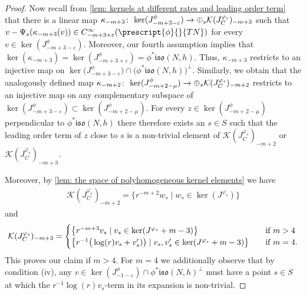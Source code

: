 \documentclass{article}
\numberwithin{equation}{section}        %
\theoremstyle{bfnote}
\theoremstyle{definition}
\theoremstyle{bfremark}
\newcommand{\col}{\colon \thinspace}        %
\begin{document}
\begin{proof}
    Now recall from \cref{lem: kernels at different rates and leading order term} that there is a linear map $\kappa_{-m+3} \col \ker (J_{-m+3-\varepsilon}^{\phi}) \to \oplus_s \mathcal{K}(J^{\varphi_s}_C)_{-m+3}$ such that $v-\Psi_s(\kappa_{-m+3}(v)) \in C^{\infty}_{-m+3+\varepsilon}(\prescript{\phi}{}{TN})$ for every $v \in \ker (J_{-m+3-\varepsilon}^{\phi})$. Moreover, our fourth assumption implies that $\ker(\kappa_{-m+3}) = \ker (J_{-m+3+\varepsilon}^{\phi}) = \phi^* \mathfrak{iso}(N,h)$. Thus, $\kappa_{-m+3}$ restricts to an injective map on $\ker\big(J^{\phi}_{-m+3-\varepsilon} \big) \cap \big(\phi^*\mathfrak{iso}(N,h)\big)^{\perp}$. Similarly, we obtain that the analogously defined map $\kappa_{-m+2} \col \ker (J_{-m+2-\mu}^{\phi}) \to \oplus_s \mathcal{K}(J^{\varphi_s}_C)_{-m+2}$ restricts to an injective map on any complementary subspace of $\ker (J_{-m+3-\varepsilon}^{\phi}) \subset \ker (J_{-m+2-\mu}^{\phi})$. For every $z \in \ker(J^{\phi}_{-m+2-\mu})$ perpendicular to $\phi^*\mathfrak{iso}(N,h)$ there therefore exists an $s\in S$ such that the leading order term of $z$ close to $s$ is a non-trivial element of $\mathcal{K}(J^{\varphi_s}_C)_{-m+2}$ or $\mathcal{K}(J^{\varphi_s}_C)_{-m+3}$.

    Moreover, by \cref{lem: the space of polyhomogeneous kernel elements} we have
    \begin{align*}
        \mathcal{K}(J^{\varphi_s}_C)_{-m+2} = \big\{ r^{-m+2} w_s \mid w_s \in \ker(J^{\varphi_s}) \big\}
    \end{align*}
    and
    \begin{align*}
        \mathcal{K}(J^{\varphi_s}_C)_{-m+3} = 
        \begin{cases}
            \big\{ r^{-m+3} v_s \mid v_s \in \ker(J^{\varphi_s} + m -3) \big\} \quad &\textup{if $m>4$} \\
            \big\{ r^{-1} \big(\log(r)v_s + v^\prime_s)\big) \mid v_s, v^\prime_s \in \ker(J^{\varphi_s} + m -3)\big\} \quad &\textup{if $m=4$.}
        \end{cases}
    \end{align*}
    This proves our claim if $m>4$. For $m=4$ we additionally observe that by condition (iv), any $v \in \ker(J^{\phi}_{-1-\varepsilon}) \cap \phi^*\mathfrak{iso}(N,h)^{\perp}$ must have a point $s \in S$ at which the $r^{-1} \log(r) v_s$-term in its expansion is non-trivial.


\end{proof}
\end{document}
